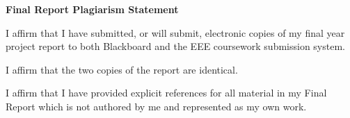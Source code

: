 \vspace*{\fill}
\begin{center}
\textbf{Final Report Plagiarism Statement}
\end{center}
    
I affirm that I have submitted, or will submit, electronic copies of my final year project report to both Blackboard and the EEE coursework submission system.

I affirm that the two copies of the report are identical.

I affirm that I have provided explicit references for all material in my Final Report which is not authored by me and represented as my own work. 
\vspace*{\fill}